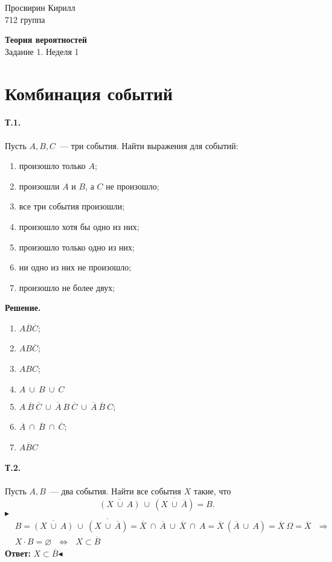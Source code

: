 \documentclass[a4paper,12pt]{article} %
\newcommand{\tb}[1]{\textbf{#1}}
\newcommand{\ol}[1]{\ensuremath{\overline{#1}}}
\begin{document}

\hfill
\begin{minipage}{4cm}
	Просвирин Кирилл\\
	712 группа\\
\end{minipage}

\begin{center}
	\Large\textbf{Теория вероятностей\\} 
	\large Задание 1. Неделя 1
\end{center}

\section{Комбинация событий}

\paragraph{Т.1.} Пусть $ A, B, C $~--- три события. 
Найти выражения для событий:
\begin{enumerate}
	\item произошло только $ A $;
	\item произошли $ A $ и $ B $, а $ C $ не произошло;
	\item все три события произошли;
	\item произошло хотя бы одно из них;
	\item произошло только одно из них;
	\item ни одно из них не произошло;
	\item произошло не более двух;
\end{enumerate}

\textbf{Решение.}

\begin{enumerate}
	\item $ A\overline{B}\overline{C} $;
	\item $ AB\overline{C} $;
	\item $ ABC $;
	\item $ A~\cup~B~\cup~C $
	\item $ A~\overline{B}~\overline{C}~
	\cup~\overline{A}~B~\overline{C}~
	\cup~\overline{A}~\overline{B}~C $;
	\item $ \overline{A}~\cap~\overline{B}~\cap~\overline{C} $;
	\item $ \overline{ABC} $
\end{enumerate}

\paragraph{Т.2.} Пусть $ A, B $~--- два события. 
Найти все события $ X $ такие, что
\[
	\overline{(X~\cup~A)}~\cup~\overline{(X~\cup~\overline{A})}=B.
\]
$ \blacktriangleright $
\begin{align}&
	B=\overline{(X~\cup~A)}~\cup~\overline{(X~\cup~\overline{A})}=
	\ol{X}~\cap~\ol{A}~\cup~\ol{X}~\cap~A=
	\ol{X}~(\ol{A}~\cup~A)=\ol{X}~\Omega=\ol{X}~~~\Longrightarrow\\
	&X\cdot B=\varnothing~~~\Longleftrightarrow~~~X\subset\ol{B}	
\end{align}
\tb{Ответ: }$ X\subset\ol{B} $\hfill$ \blacktriangleleft $
\end{document}
